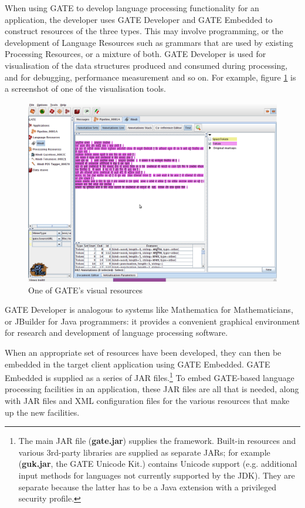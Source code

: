When using GATE to develop language processing functionality for an
application, the developer uses GATE Developer and GATE Embedded to
construct resources of the three types. This may involve programming,
or the development of Language Resources such as grammars that are
used by existing Processing Resources, or a mixture of both. GATE
Developer is used for visualisation of the data structures produced
and consumed during processing, and for debugging, performance
measurement and so on. For example, figure
\ref{fig:hindi} is a screenshot of one of the visualisation tools.
%
\begin{figure}[!htb]
\begin{center}
\includegraphics[width=14cm]{hindi-screenshot.png}
\end{center}
\caption{One of GATE's visual resources}
\label{fig:hindi}
\end{figure}
%

GATE Developer is analogous to systems like Mathematica for
Mathematicians, or JBuilder for Java programmers: it provides a
convenient graphical environment for research and development of
language processing software.

When an appropriate set of resources have been developed, they can then be
embedded in the target client application using GATE Embedded. GATE Embedded is
supplied as a series of JAR files.\footnote{The main JAR file ({\bf gate.jar})
supplies the framework. Built-in resources and various 3rd-party libraries are
supplied as separate JARs; for example ({\bf guk.jar}, the GATE Unicode Kit.)
contains Unicode support (e.g. additional input methods for languages not currently supported by the JDK). They
are separate because the latter has to be a Java extension with a privileged
security profile.} To embed GATE-based language processing facilities in an
application, these JAR files are all that is needed, along with JAR files and XML
configuration files for the various resources that make up the new facilities.


